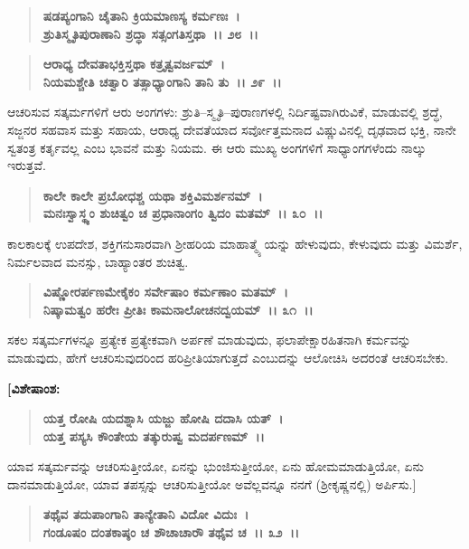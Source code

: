 \begin{verse}
\textbf{ಷಡಪ್ಯಂಗಾನಿ ಚೈತಾನಿ ಕ್ರಿಯಮಾಣಸ್ಯ ಕರ್ಮಣಃ~।}\\\textbf{ಶ್ರುತಿಸ್ಮೃತಿಪುರಾಣಾನಿ ಶ್ರದ್ಧಾ ಸತ್ಸಂಗತಿಸ್ತಥಾ~।। ೨೮~।। }
\end{verse}

\begin{verse}
\textbf{ಆರಾಧ್ಯ ದೇವತಾಭಕ್ತಿಸ್ತಥಾ ಕತ್ರೃತ್ವವರ್ಜಮ್~।}\\\textbf{ನಿಯಮಶ್ಚೇತಿ ಚತ್ವಾರಿ ತತ್ಸಾಧ್ಯಾಂಗಾನಿ ತಾನಿ ತು~।। ೨೯~।।}
\end{verse}

ಆಚರಿಸುವ ಸತ್ಕರ್ಮಗಳಿಗೆ ಆರು ಅಂಗಗಳು: ಶ್ರುತಿ–ಸ್ಮೃತಿ–ಪುರಾಣಗಳಲ್ಲಿ ನಿರ್ದಿಷ್ಟವಾಗಿರುವಿಕೆ, ಮಾಡುವಲ್ಲಿ ಶ್ರದ್ಧೆ, ಸಜ್ಜನರ ಸಹವಾಸ ಮತ್ತು ಸಹಾಯ, ಆರಾಧ್ಯ ದೇವತೆಯಾದ ಸರ್ವೋತ್ತಮನಾದ ವಿಷ್ಣುವಿನಲ್ಲಿ ದೃಢವಾದ ಭಕ್ತಿ, ನಾನೇ ಸ್ವತಂತ್ರ ಕರ್ತೃವಲ್ಲ ಎಂಬ ಭಾವನೆ ಮತ್ತು ನಿಯಮ. ಈ ಆರು ಮುಖ್ಯ ಅಂಗಗಳಿಗೆ ಸಾಧ್ಯಾಂಗಗಳೆಂದು ನಾಲ್ಕು ಇರುತ್ತವೆ.

\begin{verse}
\textbf{ಕಾಲೇ ಕಾಲೇ ಪ್ರಬೋಧಶ್ಚ ಯಥಾ ಶಕ್ತಿವಿಮರ್ಶನಮ್~।}\\\textbf{ಮನಃಸ್ವಾಸ್ಥ್ಯಂ ಶುಚಿತ್ವಂ ಚ ಪ್ರಧಾನಾಂಗಂ ತ್ವಿದಂ ಮತಮ್~।। ೩೦~।।}
\end{verse}

ಕಾಲಕಾಲಕ್ಕೆ ಉಪದೇಶ, ಶಕ್ತಿಗನುಸಾರವಾಗಿ ಶ‍್ರೀಹರಿಯ ಮಾಹಾತ್ಮ್ಯೆ ಯನ್ನು ಹೇಳುವುದು, ಕೇಳುವುದು ಮತ್ತು ವಿಮರ್ಶೆ, ನಿರ್ಮಲವಾದ ಮನಸ್ಸು, ಬಾಹ್ಯಾಂತರ ಶುಚಿತ್ವ.

\begin{verse}
\textbf{ವಿಷ್ಣೋರರ್ಪಣಮೇಕೈಕಂ ಸರ್ವೇಷಾಂ ಕರ್ಮಣಾಂ ಮತಮ್~।}\\\textbf{ನಿಷ್ಕಾಮತ್ವಂ ಹರೇಃ ಪ್ರೀತಿಃ ಕಾಮನಾಲೋಚನದ್ವಯಮ್~।। ೩೧~।।}
\end{verse}

ಸಕಲ ಸತ್ಕರ್ಮಗಳನ್ನೂ ಪ್ರತ್ಯೇಕ ಪ್ರತ್ಯೇಕವಾಗಿ ಅರ್ಪಣೆ ಮಾಡುವುದು, ಫಲಾಪೇಕ್ಷಾರಹಿತನಾಗಿ ಕರ್ಮವನ್ನು ಮಾಡುವುದು, ಹೇಗೆ ಆಚರಿಸುವುದರಿಂದ ಹರಿಪ್ರೀತಿಯಾಗುತ್ತದೆ ಎಂಬುದನ್ನು ಆಲೋಚಿಸಿ ಅದರಂತೆ ಆಚರಿಸಬೇಕು.

\begin{flushleft}
\textbf{[ವಿಶೇಷಾಂಶ:}
\end{flushleft}

\begin{verse}
\textbf{ಯತ್ತ ರೋಷಿ ಯದಶ್ನಾಸಿ ಯಜ್ಜು ಹೋಷಿ ದದಾಸಿ ಯತ್~।}\\\textbf{ಯತ್ತ ಪಸ್ಯಸಿ ಕೌಂತೇಯ ತತ್ಕುರುಷ್ವ ಮದರ್ಪಣಮ್~।।} 
\end{verse}

ಯಾವ ಸತ್ಕರ್ಮವನ್ನು ಆಚರಿಸುತ್ತೀಯೋ, ಏನನ್ನು ಭುಂಜಿಸುತ್ತೀಯೋ, ಏನು ಹೋಮಮಾಡುತ್ತಿಯೋ, ಏನು ದಾನಮಾಡುತ್ತಿಯೋ, ಯಾವ ತಪಸ್ಸನ್ನು ಆಚರಿಸುತ್ತೀಯೋ ಅವೆಲ್ಲವನ್ನೂ ನನಗೆ (ಶ‍್ರೀಕೃಷ್ಣನಲ್ಲಿ) ಅರ್ಪಿಸು.]

\begin{verse}
\textbf{ತಥೈವ ತದುಪಾಂಗಾನಿ ತಾನ್ಯೇತಾನಿ ವಿದೋ ವಿದುಃ~।}\\\textbf{ಗಂಡೂಷಂ ದಂತಕಾಷ್ಠಂ ಚ ಶೌಚಾಚಾರೌ ತಥೈವ ಚ~।। ೩೨~।।}
\end{verse}

